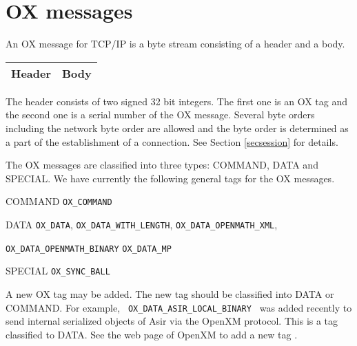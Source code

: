 
\section{OX messages}

An OX message for TCP/IP is a byte stream consisting of
a header and a body.
\begin{center}
\begin{tabular}{|c|c|}
\hline
Header	& \hspace{10mm} Body \hspace{10mm} \\
\hline
\end{tabular}
\end{center}
The header consists of two signed 32 bit integers.
The first one is an OX tag 
and the second one is a serial number of the OX message.
Several byte orders including the network byte order
are allowed and the byte order is determined as a part of
the establishment of a connection. See Section \ref{secsession} for details.

The OX messages are classified into three types:
COMMAND, DATA and SPECIAL.
We have currently the following general tags for the OX messages.
\begin{description}
\item{COMMAND}
{\tt OX\_COMMAND}
\item{DATA}
{\tt OX\_DATA}, {\tt OX\_DATA\_WITH\_LENGTH}, {\tt OX\_DATA\_OPENMATH\_XML},

{\tt OX\_DATA\_OPENMATH\_BINARY} {\tt OX\_DATA\_MP} \item{SPECIAL} {\tt OX\_SYNC\_BALL}
\end{description}

A new OX tag may be added.
The new tag should be classified into DATA or COMMAND.
For example, \verb+ OX_DATA_ASIR_LOCAL_BINARY +  was added recently
to send internal serialized objects of Asir via the OpenXM protocol.
This is a tag classified to DATA.
See the web page of OpenXM to add a new tag \cite{openxm-web}.

%
